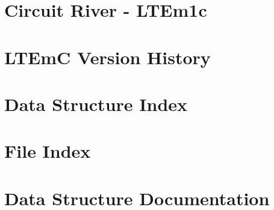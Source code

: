 \let\mypdfximage\pdfximage\def\pdfximage{\immediate\mypdfximage}\documentclass[twoside]{book}
\newcommand{\+}{\discretionary{\mbox{\scriptsize$\hookleftarrow$}}{}{}}
\begin{document}
\chapter{Circuit River -\/ L\+T\+Em1c}
\label{md_tests__l_t_em_c-8-mqtt__r_e_a_d_m_e}

\chapter{L\+T\+EmC Version History}
\label{md_version-history}

\chapter{Data Structure Index}

\chapter{File Index}

\chapter{Data Structure Documentation}





































\end{document}
